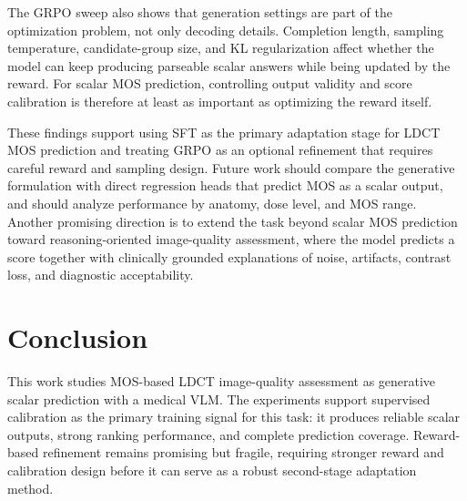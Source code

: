 \documentclass[10pt,twocolumn,letterpaper]{article}
\begin{document}
The GRPO sweep also shows that generation settings are part of the optimization problem, not only decoding details. Completion length, sampling temperature, candidate-group size, and KL regularization affect whether the model can keep producing parseable scalar answers while being updated by the reward. For scalar MOS prediction, controlling output validity and score calibration is therefore at least as important as optimizing the reward itself.

These findings support using SFT as the primary adaptation stage for LDCT MOS prediction and treating GRPO as an optional refinement that requires careful reward and sampling design. Future work should compare the generative formulation with direct regression heads that predict MOS as a scalar output, and should analyze performance by anatomy, dose level, and MOS range. Another promising direction is to extend the task beyond scalar MOS prediction toward reasoning-oriented image-quality assessment, where the model predicts a score together with clinically grounded explanations of noise, artifacts, contrast loss, and diagnostic acceptability.

\section{Conclusion}
This work studies MOS-based LDCT image-quality assessment as generative scalar prediction with a medical VLM. The experiments support supervised calibration as the primary training signal for this task: it produces reliable scalar outputs, strong ranking performance, and complete prediction coverage. Reward-based refinement remains promising but fragile, requiring stronger reward and calibration design before it can serve as a robust second-stage adaptation method.



\end{document}
